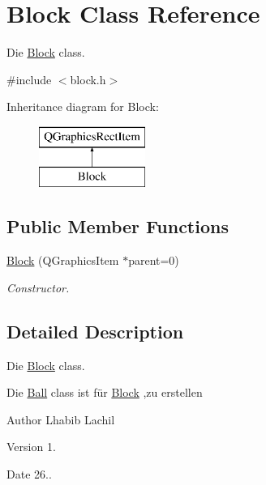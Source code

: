 \hypertarget{class_block}{}\section{Block Class Reference}
\label{class_block}


Die \hyperlink{class_block}{Block} class.  




{\ttfamily \#include $<$block.\+h$>$}

Inheritance diagram for Block\+:\begin{figure}[H]
\begin{center}
\leavevmode
\includegraphics[height=2.000000cm]{class_block}
\end{center}
\end{figure}
\subsection*{Public Member Functions}
\begin{DoxyCompactItemize}
\item 
\hyperlink{class_block_a2577ea15ea83c909f9519842fa160fd0}{Block} (Q\+Graphics\+Item $\ast$parent=0)
\begin{DoxyCompactList}\small\item\em Constructor. \end{DoxyCompactList}\end{DoxyCompactItemize}


\subsection{Detailed Description}
Die \hyperlink{class_block}{Block} class. 

Die \hyperlink{class_ball}{Ball} class ist für \hyperlink{class_block}{Block} ,zu erstellen \begin{DoxyAuthor}{Author}
Lhabib Lachil 
\end{DoxyAuthor}
\begin{DoxyVersion}{Version}
1. 
\end{DoxyVersion}
\begin{DoxyDate}{Date}
26.. 
\end{DoxyDate}


